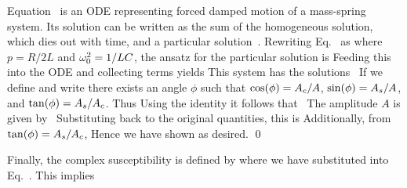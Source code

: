 \documentclass[11pt]{article}
\begin{document}
{	Equation~ is an ODE representing forced damped motion of a mass-spring system.  Its solution can be written as the sum of the homogeneous solution, which dies out with time, and a particular solution~\cite[pp.~38, 40, 50--51]{Olmstead}.  Rewriting Eq.~ as
	where $p = R / 2 L$ and $\omega_0^2 = 1 / L C$, the ansatz for the particular solution is
	Feeding this into the ODE and collecting terms yields
	This system has the solutions~\cite[p.~51]{Olmstead}
	If we define
	and write
	there exists an angle $\phi$ such that $\cos(\phi) = A_c / A$, $\sin(\phi) = A_s / A$, and $\tan(\phi) = A_s / A_c$.  Thus
	\eq{
		\qt = A [ \cos(\phi) \cos(\omg t) + \sin(\phi) \sin(\omg).
	}
	Using the identity
	\eq{
		\cos(\alp) \cos(\bet) + \sin(\alp) \sin(\bet) = \cos(\alp - \bet),
	}
	it follows that~\cite[pp.~39, 51]{Olmstead}
	The amplitude $A$ is given by~\cite[p.~51]{Olmstead}
	Substituting back to the original quantities, this is
	Additionally, from $\tan(\phi) = A_s / A_c$,
	Hence we have shown
	as desired. \qed
	
	Finally, the complex susceptibility is defined by
	where we have substituted into Eq.~.  This implies
	\vfix
}
\end{document}
